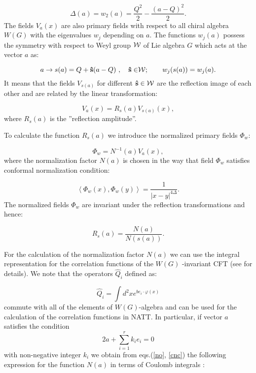 \documentclass[a4paper,12pt]{article}
\begin{document}
\begin{equation}
\Delta (a)=w_2(a)=\frac{Q^2}2-\frac{(a-Q)^2}{2}.  \label{dim}
\end{equation}
The fields $V_a(x)$ are also primary fields with respect to all chiral
algebra $W(G)$ with the eigenvalues $w_j$ depending on $a$. The functions 
$w_j(a)$ possess the symmetry with respect to Weyl group ${\cal W}$ of Lie
algebra $G$ \cite{FL} which acts at the vector $a$ as:

\begin{equation}
a\rightarrow s(a)=Q+{\bf \hat{s}}(a-Q){\bf \ ,\quad \hat{s}\in }{\cal W}
;\qquad w_j(s(a))=w_j(a).  \label{wg}
\end{equation}
It means that the fields $V_{s(a)}$ for different ${\bf\hat{s}}\in {\cal W}$ 
are the reflection image of each other and are related by the linear 
transformation:

\begin{equation}
V_a(x)=R_s(a)V_{s(a)}(x),  \label{ra}
\end{equation}
where $R_s(a)$ is the ''reflection amplitude''.

To calculate the function $R_s(a)$ we introduce the normalized primary
fields $\Phi _w:$

\begin{equation}
\Phi _w=N^{-1}(a)V_a(x),  \label{no}
\end{equation}
where the normalization factor $N(a)$ is chosen in the way that field $\Phi
_w$ satisfies conformal normalization condition:

\begin{equation}
\left\langle \Phi _w\left( x\right) ,\Phi _w\left( y\right) \right\rangle =
\frac 1{\left| x-y\right| ^{4\Delta }}.  \label{cnc}
\end{equation}
The normalized fields $\Phi _w$ are invariant under the reflection
transformations and hence:

\begin{equation}
R_s(a)=\frac{N(a)}{N(s(a))}.  \label{rnr}
\end{equation}

For the calculation of the normalization factor $N(a)$ we can use the
integral representation for the correlation functions of the $W(G)$
-invariant CFT (see \cite{FL} for details). We note that the operators $
\hat{Q}_i$ defined as:

\begin{equation}
\hat{Q}_i=\int d^2xe^{be_i\cdot \varphi (x)}  \label{sc}
\end{equation}
commute with all of the elements of $W(G)$-algebra and can be used for the
calculation of the correlation functions in NATT. In particular, if vector 
$ a $ satisfies the condition 
\begin{equation}
2a+\sum_{i=1}^rk_ie_i=0  \label{con}
\end{equation}
with non-negative integer $k_i$ we obtain from eqs.(\ref{no}, \ref{cnc}) the
following expression for the function $N(a)$ in terms of Coulomb integrals 
\cite{FL}:
\end{document}
